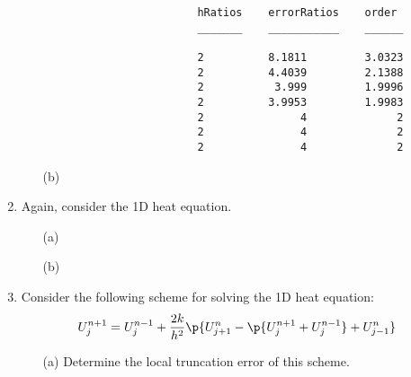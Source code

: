 \documentclass[11pt, oneside, titlepage]{article}
\begin{document}
\begin{enumerate}
\begin{enumerate}
\begin{verbatim}
                        hRatios    errorRatios    order 
                        _______    ___________    ______

                        2          8.1811         3.0323
                        2          4.4039         2.1388
                        2           3.999         1.9996
                        2          3.9953         1.9983
                        2               4              2
                        2               4              2
                        2               4              2
                \end{verbatim}

            \item[(b)]

        \end{enumerate}

    \item %
        Again, consider the 1D heat equation.
        \begin{enumerate}
            \item[(a)]

            \item[(b)]

        \end{enumerate}
    \item %
        Consider the following scheme for solving the 1D heat equation:
        \[
            U_j^{n+1} = U_j^{n-1} + \frac{2k}{h^2}
            \p{U^n_{j+1} - \p{U^{n+1}_j + U^{n-1}_j} + U^n_{j-1}}
        \]
        \begin{enumerate}
            \item[(a)]
                Determine the local truncation error of this scheme.


\end{enumerate}
\end{enumerate}
\end{document}

